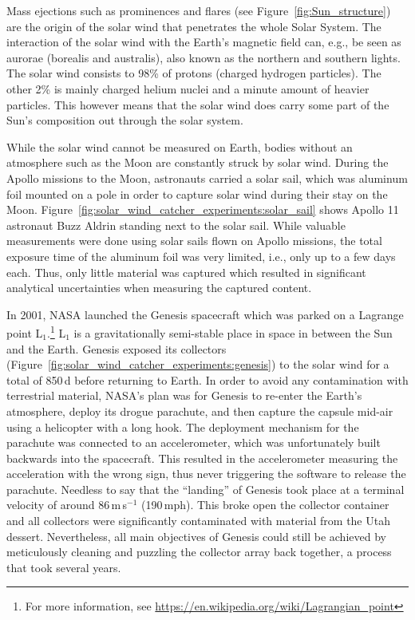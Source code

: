 Mass ejections such as prominences and flares (see Figure~\ref{fig:Sun_structure}) are the origin of the solar wind that penetrates the whole Solar System. The interaction of the solar wind with the Earth's magnetic field can, e.g., be seen as aurorae (borealis and australis), also known as the northern and southern lights. The solar wind consists to 98\% of protons (charged hydrogen particles). The other 2\% is mainly charged helium nuclei and a minute amount of heavier particles. This however means that the solar wind does carry some part of the Sun's composition out through the solar system.

While the solar wind cannot be measured on Earth, bodies without an atmosphere such as the Moon are constantly struck by solar wind. During the Apollo missions to the Moon, astronauts carried a solar sail, which was aluminum foil mounted on a pole in order to capture solar wind during their stay on the Moon. Figure~\ref{fig:solar_wind_catcher_experiments:solar_sail} shows Apollo 11 astronaut Buzz Aldrin standing next to the solar sail. While valuable measurements were done using solar sails flown on Apollo missions, the total exposure time of the aluminum foil was very limited, i.e., only up to a few days each. Thus, only little material was captured which resulted in significant analytical uncertainties when measuring the captured content.

In 2001, NASA launched the Genesis spacecraft which was parked on a Lagrange point L$_1$.\footnote{For more information, see \url{https://en.wikipedia.org/wiki/Lagrangian_point}} L$_1$ is a gravitationally semi-stable place in space in between the Sun and the Earth. Genesis exposed its collectors (Figure~\ref{fig:solar_wind_catcher_experiments:genesis}) to the solar wind for a total of 850\,d before returning to Earth. In order to avoid any contamination with terrestrial material, NASA's plan was for Genesis to re-enter the Earth's atmosphere, deploy its drogue parachute, and then capture the capsule mid-air using a helicopter with a long hook. The deployment mechanism for the parachute was connected to an accelerometer, which was unfortunately built backwards into the spacecraft. This resulted in the accelerometer measuring the acceleration with the wrong sign, thus never triggering the software to release the parachute. Needless to say that the ``landing'' of Genesis took place at a terminal velocity of around 86\,m\,s$^{-1}$ (190\,mph). This broke open the collector container and all collectors were significantly contaminated with material from the Utah dessert. Nevertheless, all main objectives of Genesis could still be achieved by meticulously cleaning and puzzling the collector array back together, a process that took several years.


